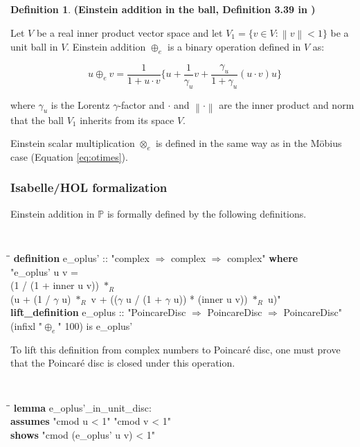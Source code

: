 \documentclass[a4paper]{article}
\newcommand{\tab}{\hspace{5mm}}
\theoremstyle{definition}
\newtheorem{definition}{Definition}[section]
\newcommand{\norm}[1]{\left\lVert#1\right\rVert}
\begin{document}
\begin{definition}\textbf{(Einstein addition in the ball, Definition 3.39 in \cite{ungar-analytic})}
  \label{def:einsteinaddition}

  Let $V$ be a real inner product vector space and let
  $V_1 = \{v\in V: \norm{v}<1\}$ be a unit ball in $V$. Einstein
  addition $\oplus_e$ is a binary operation defined in $V$ as:
  
  $$u \oplus_e v = \frac{1}{1+u\cdot v}\Big\{u+\frac{1}{\gamma_u}v+\frac{\gamma_u}{1+\gamma_u}(u\cdot v)u\Big\}$$
  
  \noindent where $\gamma_u$ is the Lorentz $\gamma$-factor and
  $\cdot$ and $\norm{\cdot}$ are the inner product and norm that the
  ball $V_1$ inherits from its space $V$.
\end{definition}

Einstein scalar multiplication $\otimes_{e}$ is defined in the same
way as in the M\"obius case (Equation \ref{eq:otimes}).

\subsubsection{Isabelle/HOL formalization}

Einstein addition in $\mathbb{P}$ is formally defined by the following
definitions.

{\tt
\begin{small}
\begin{tabbing}
\tab\=\tab\=\kill
{\bf definition} e\_oplus' :: "complex $\Rightarrow$ complex $\Rightarrow$ complex" {\bf where}\\
\>  "e\_oplus' u v = \\
\>\>(1 / (1 + inner u v)) $*_R$\\
\>\>(u + (1 / $\gamma$ u) $*_R$ v + (($\gamma$ u / (1 + $\gamma$ u)) * (inner u v)) $*_R$ u)"\\
{\bf lift\_definition} e\_oplus :: "PoincareDisc $\Rightarrow$ PoincareDisc $\Rightarrow$ PoincareDisc"\\
\> (infixl "$\oplus_e$" 100) is e\_oplus'
\end{tabbing}
\end{small}
}

To lift this definition from complex numbers to Poincar\'e disc, one
must prove that the Poincar\'e disc is closed under this operation.

{\tt
\begin{small}
\begin{tabbing}
\tab\=\tab\=\kill
{\bf lemma} e\_oplus'\_in\_unit\_disc:\\
\>  {\bf assumes} "cmod u < 1" "cmod v < 1"\\
\>  {\bf shows} "cmod (e\_oplus' u v) < 1"
\end{tabbing}
\end{small}
}
\end{document}
